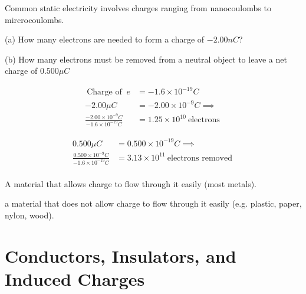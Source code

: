 

\begin{example}[]
	Common static electricity involves charges ranging from nanocoulombs to mircrocoulombs.

	(a) How many electrons are needed to form a charge of $-2.00nC$?

	(b) How many electrons must be removed from a neutral object to leave a net charge of $0.500 \mu C$
\end{example}

\begin{solution}[a]
	\begin{align*}
		\:\text{Charge of }\:e&= -1.6 \times  10^{-19} C\\
		-2.00 \mu C &= -2.00 \times  10^{-9} C \implies\\
		\frac{-2.00\times 10^{-9}C}{-1.6 \times 10^{-19}C} &= 1.25 \times 10^{10}\:\text{electrons}\:
	\end{align*}
\end{solution}

\begin{solution}[b]
	\begin{align*}
		0.500 \mu C &= 0.500 \times 10^{-19}C  \implies\\
		\frac{0.500\times 10^{-9}C}{-1.6\times 10^{-19}C} &=  3.13 \times 10^{11} \:\text{electrons removed}\:\\
	\end{align*}

\end{solution}

\begin{definition}[Conductor]
	A material that allows charge to flow through it easily (most metals).
\end{definition}
\begin{definition}[Insulator]
	a material that does not allow charge to flow through it easily (e.g. plastic,
	paper, nylon, wood).
\end{definition}

\section{Conductors, Insulators, and Induced Charges}%
\label{sec:conductors_insulators_and_induced_charges}


